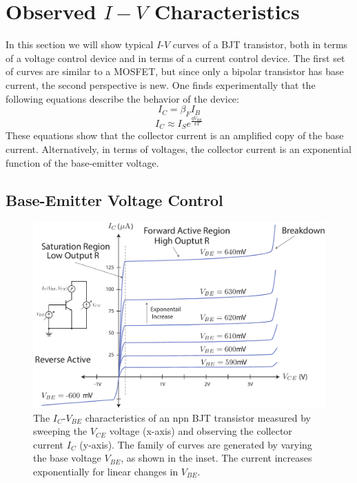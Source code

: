 \section{Observed $I-V$ Characteristics}
In this section we will show typical $I$-$V$ curves of a BJT transistor, both in terms of a voltage control device and in terms of a current control device.  The first set of curves are similar to a MOSFET, but since only a bipolar transistor has base current, the second perspective is new.  One finds experimentally that the following equations describe the behavior of the device:
\begin{equation}
	{I_C} = \beta_F {I_B}
\end{equation}
\begin{equation}
	{I_C} \approx {I_S}{e^{\frac{{q{V_{BE}}}}{{kT}}}}
\end{equation}
These equations show that the collector current is an amplified copy of the base current.  Alternatively, in terms of voltages, the collector current is an exponential function of the base-emitter voltage.
\subsection{Base-Emitter Voltage Control}
\begin{figure}[tb]
\begin{center}
\includegraphics[width=\columnwidth]{slide8_bjt_ic_vs_ve_curves}
\end{center}
\caption{The $I_C$-$V_{BE}$ characteristics of an npn BJT transistor measured by sweeping the $V_{CE}$ voltage (x-axis) and observing the collector current $I_C$ (y-axis).  The family of curves are generated by varying the base voltage $V_{BE}$, as shown in the inset.  The current increases exponentially for linear changes in $V_{BE}$.}
\label{fig:slide8_bjt_ic_vs_ve_curves}
\end{figure}


